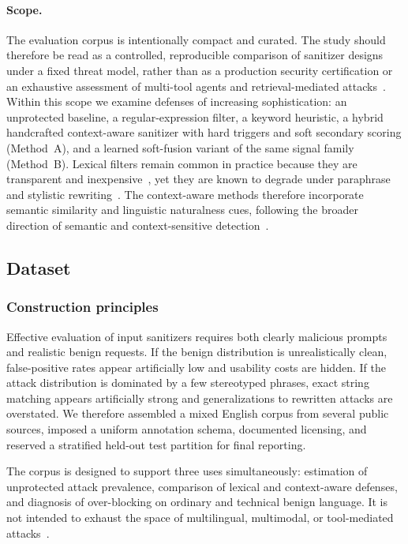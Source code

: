 \paragraph{Scope.}
The evaluation corpus is intentionally compact and curated.
The study should therefore be read as a controlled, reproducible comparison of sanitizer designs under a fixed threat model, rather than as a production security certification or an exhaustive assessment of multi-tool agents and retrieval-mediated attacks~\cite{debenedetti2024agentdojo,greshake2023indirect}.
Within this scope we examine defenses of increasing sophistication: an unprotected baseline, a regular-expression filter, a keyword heuristic, a hybrid handcrafted context-aware sanitizer with hard triggers and soft secondary scoring (Method~A), and a learned soft-fusion variant of the same signal family (Method~B).
Lexical filters remain common in practice because they are transparent and inexpensive~\cite{openrouter2026promptinjection,getstream2024prompt,mend2024prompt}, yet they are known to degrade under paraphrase and stylistic rewriting~\cite{yi2024jailbreak,wang2025promptsleuth}.
The context-aware methods therefore incorporate semantic similarity and linguistic naturalness cues, following the broader direction of semantic and context-sensitive detection~\cite{wang2025promptsleuth,kholkar2025capture,bair2025prompt}.

\subsection{Dataset}
\label{sec:dataset}

\subsubsection{Construction principles}

Effective evaluation of input sanitizers requires both clearly malicious prompts and realistic benign requests.
If the benign distribution is unrealistically clean, false-positive rates appear artificially low and usability costs are hidden.
If the attack distribution is dominated by a few stereotyped phrases, exact string matching appears artificially strong and generalizations to rewritten attacks are overstated.
We therefore assembled a mixed English corpus from several public sources, imposed a uniform annotation schema, documented licensing, and reserved a stratified held-out test partition for final reporting.

The corpus is designed to support three uses simultaneously: estimation of unprotected attack prevalence, comparison of lexical and context-aware defenses, and diagnosis of over-blocking on ordinary and technical benign language.
It is not intended to exhaust the space of multilingual, multimodal, or tool-mediated attacks~\cite{yeo2025multimodal,debenedetti2024agentdojo}.

